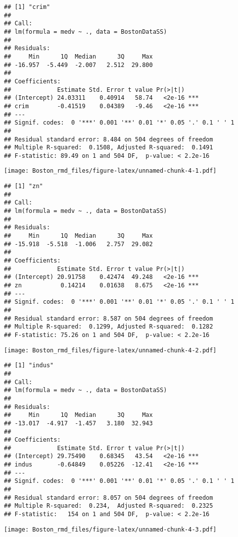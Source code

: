 \documentclass[]{article}
\begin{document}
\begin{verbatim}
## [1] "crim"
## 
## Call:
## lm(formula = medv ~ ., data = BostonDataSS)
## 
## Residuals:
##     Min      1Q  Median      3Q     Max 
## -16.957  -5.449  -2.007   2.512  29.800 
## 
## Coefficients:
##             Estimate Std. Error t value Pr(>|t|)    
## (Intercept) 24.03311    0.40914   58.74   <2e-16 ***
## crim        -0.41519    0.04389   -9.46   <2e-16 ***
## ---
## Signif. codes:  0 '***' 0.001 '**' 0.01 '*' 0.05 '.' 0.1 ' ' 1
## 
## Residual standard error: 8.484 on 504 degrees of freedom
## Multiple R-squared:  0.1508, Adjusted R-squared:  0.1491 
## F-statistic: 89.49 on 1 and 504 DF,  p-value: < 2.2e-16
\end{verbatim}

\texttt{[image: Boston\_rmd\_files/figure-latex/unnamed-chunk-4-1.pdf]}

\begin{verbatim}
## [1] "zn"
## 
## Call:
## lm(formula = medv ~ ., data = BostonDataSS)
## 
## Residuals:
##     Min      1Q  Median      3Q     Max 
## -15.918  -5.518  -1.006   2.757  29.082 
## 
## Coefficients:
##             Estimate Std. Error t value Pr(>|t|)    
## (Intercept) 20.91758    0.42474  49.248   <2e-16 ***
## zn           0.14214    0.01638   8.675   <2e-16 ***
## ---
## Signif. codes:  0 '***' 0.001 '**' 0.01 '*' 0.05 '.' 0.1 ' ' 1
## 
## Residual standard error: 8.587 on 504 degrees of freedom
## Multiple R-squared:  0.1299, Adjusted R-squared:  0.1282 
## F-statistic: 75.26 on 1 and 504 DF,  p-value: < 2.2e-16
\end{verbatim}

\texttt{[image: Boston\_rmd\_files/figure-latex/unnamed-chunk-4-2.pdf]}

\begin{verbatim}
## [1] "indus"
## 
## Call:
## lm(formula = medv ~ ., data = BostonDataSS)
## 
## Residuals:
##     Min      1Q  Median      3Q     Max 
## -13.017  -4.917  -1.457   3.180  32.943 
## 
## Coefficients:
##             Estimate Std. Error t value Pr(>|t|)    
## (Intercept) 29.75490    0.68345   43.54   <2e-16 ***
## indus       -0.64849    0.05226  -12.41   <2e-16 ***
## ---
## Signif. codes:  0 '***' 0.001 '**' 0.01 '*' 0.05 '.' 0.1 ' ' 1
## 
## Residual standard error: 8.057 on 504 degrees of freedom
## Multiple R-squared:  0.234,  Adjusted R-squared:  0.2325 
## F-statistic:   154 on 1 and 504 DF,  p-value: < 2.2e-16
\end{verbatim}

\texttt{[image: Boston\_rmd\_files/figure-latex/unnamed-chunk-4-3.pdf]}
\end{document}
